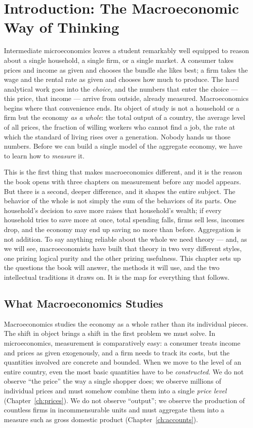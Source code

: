 \chapter{Introduction: The Macroeconomic Way of Thinking}
\label{ch:intro}

Intermediate microeconomics leaves a student remarkably well equipped to reason about a single household, a single firm, or a single market. A consumer takes prices and income as given and chooses the bundle she likes best; a firm takes the wage and the rental rate as given and chooses how much to produce. The hard analytical work goes into the \emph{choice}, and the numbers that enter the choice --- this price, that income --- arrive from outside, already measured. Macroeconomics begins where that convenience ends. Its object of study is not a household or a firm but the economy \emph{as a whole}: the total output of a country, the average level of all prices, the fraction of willing workers who cannot find a job, the rate at which the standard of living rises over a generation. Nobody hands us those numbers. Before we can build a single model of the aggregate economy, we have to learn how to \emph{measure} it.

This is the first thing that makes macroeconomics different, and it is the reason the book opens with three chapters on measurement before any model appears. But there is a second, deeper difference, and it shapes the entire subject. The behavior of the whole is not simply the sum of the behaviors of its parts. One household's decision to save more raises that household's wealth; if every household tries to save more at once, total spending falls, firms sell less, incomes drop, and the economy may end up saving no more than before. Aggregation is not addition. To say anything reliable about the whole we need theory --- and, as we will see, macroeconomists have built that theory in two very different styles, one prizing logical purity and the other prizing usefulness. This chapter sets up the questions the book will answer, the methods it will use, and the two intellectual traditions it draws on. It is the map for everything that follows.

\section{What Macroeconomics Studies}

Macroeconomics studies the economy as a whole rather than its individual pieces. The shift in object brings a shift in the first problem we must solve. In microeconomics, measurement is comparatively easy: a consumer treats income and prices as given exogenously, and a firm needs to track its costs, but the quantities involved are concrete and bounded. When we move to the level of an entire country, even the most basic quantities have to be \emph{constructed}. We do not observe ``the price'' the way a single shopper does; we observe millions of individual prices and must somehow combine them into a single \emph{price level} (Chapter~\ref{ch:prices}). We do not observe ``output''; we observe the production of countless firms in incommensurable units and must aggregate them into a measure such as gross domestic product (Chapter~\ref{ch:accounts}).

